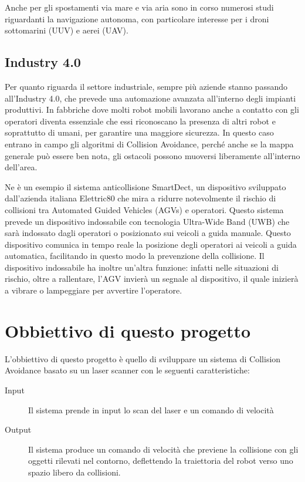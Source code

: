 \documentclass[Lau, binding=0.6cm, oneside]{sapthesis}
\begin{document}
Anche per gli spostamenti via mare e via aria sono in corso numerosi studi riguardanti la navigazione autonoma, con particolare interesse per i droni sottomarini (UUV) e aerei (UAV).

\subsection{Industry 4.0}
Per quanto riguarda il settore industriale, sempre più aziende stanno passando all'Industry 4.0, che prevede una automazione avanzata all'interno degli impianti produttivi.
In fabbriche dove molti robot mobili lavorano anche a contatto con gli operatori diventa essenziale che essi riconoscano la presenza di altri robot e soprattutto di umani, per garantire una maggiore sicurezza.
In questo caso entrano in campo gli algoritmi di Collision Avoidance, perché anche se la mappa generale può essere ben nota, gli ostacoli possono muoversi liberamente all'interno dell'area.

Ne è un esempio il sistema anticollisione SmartDect, un dispositivo sviluppato dall'azienda italiana Elettric80 che mira a ridurre notevolmente il rischio di collisioni tra Automated Guided Vehicles (AGVs) e operatori\cite{fonte9}.
Questo sistema prevede un dispositivo indossabile con tecnologia Ultra-Wide Band (UWB) che sarà indossato dagli operatori o posizionato sui veicoli a guida manuale.
Questo dispositivo comunica in tempo reale la posizione degli operatori ai veicoli a guida automatica, facilitando in questo modo la prevenzione della collisione.
Il dispositivo indossabile ha inoltre un'altra funzione: infatti nelle situazioni di rischio, oltre a rallentare, l'AGV invierà un segnale al dispositivo, il quale inizierà a vibrare o lampeggiare per avvertire l'operatore\cite{fonte10}.

\section{Obbiettivo di questo progetto}
L'obbiettivo di questo progetto è quello di sviluppare un sistema di Collision Avoidance basato su un laser scanner con le seguenti caratteristiche:
\begin{description}
	\item[Input] Il sistema prende in input lo scan del laser e un comando di velocità
	\item[Output] Il sistema produce un comando di velocità che previene la collisione con gli oggetti rilevati nel contorno, deflettendo la traiettoria del robot verso uno spazio libero da collisioni.
\end{description}
\end{document}
